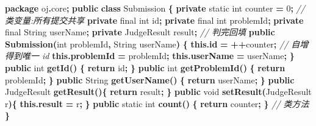 \documentclass[
  11pt,
]{ctexart}
\newenvironment{Shaded}{\begin{snugshade}}{\end{snugshade}}
\newcommand{\BuiltInTok}[1]{#1}
\newcommand{\CommentTok}[1]{\textcolor[rgb]{0.56,0.35,0.01}{\textit{#1}}}
\newcommand{\ControlFlowTok}[1]{\textcolor[rgb]{0.13,0.29,0.53}{\textbf{#1}}}
\newcommand{\DataTypeTok}[1]{\textcolor[rgb]{0.13,0.29,0.53}{#1}}
\newcommand{\DecValTok}[1]{\textcolor[rgb]{0.00,0.00,0.81}{#1}}
\newcommand{\FunctionTok}[1]{\textcolor[rgb]{0.13,0.29,0.53}{\textbf{#1}}}
\newcommand{\ImportTok}[1]{#1}
\newcommand{\KeywordTok}[1]{\textcolor[rgb]{0.13,0.29,0.53}{\textbf{#1}}}
\newcommand{\NormalTok}[1]{#1}
\newcommand{\OperatorTok}[1]{\textcolor[rgb]{0.81,0.36,0.00}{\textbf{#1}}}
\begin{document}
\begin{Shaded}
\begin{Highlighting}[]
\KeywordTok{package}\ImportTok{ oj}\OperatorTok{.}\ImportTok{core}\OperatorTok{;}
\KeywordTok{public} \KeywordTok{class}\NormalTok{ Submission }\OperatorTok{\{}
    \KeywordTok{private} \DataTypeTok{static} \DataTypeTok{int}\NormalTok{ counter }\OperatorTok{=} \DecValTok{0}\OperatorTok{;}     \CommentTok{// 类变量:所有提交共享}
    \KeywordTok{private} \DataTypeTok{final} \DataTypeTok{int}\NormalTok{ id}\OperatorTok{;}
    \KeywordTok{private} \DataTypeTok{final} \DataTypeTok{int}\NormalTok{ problemId}\OperatorTok{;}
    \KeywordTok{private} \DataTypeTok{final} \BuiltInTok{String}\NormalTok{ userName}\OperatorTok{;}
    \KeywordTok{private}\NormalTok{ JudgeResult result}\OperatorTok{;}         \CommentTok{// 判完回填}
    \KeywordTok{public} \FunctionTok{Submission}\OperatorTok{(}\DataTypeTok{int}\NormalTok{ problemId}\OperatorTok{,} \BuiltInTok{String}\NormalTok{ userName}\OperatorTok{)} \OperatorTok{\{}
        \KeywordTok{this}\OperatorTok{.}\FunctionTok{id} \OperatorTok{=} \OperatorTok{++}\NormalTok{counter}\OperatorTok{;}           \CommentTok{// 自增得到唯一 id}
        \KeywordTok{this}\OperatorTok{.}\FunctionTok{problemId} \OperatorTok{=}\NormalTok{ problemId}\OperatorTok{;}
        \KeywordTok{this}\OperatorTok{.}\FunctionTok{userName} \OperatorTok{=}\NormalTok{ userName}\OperatorTok{;}
    \OperatorTok{\}}
    \KeywordTok{public} \DataTypeTok{int} \FunctionTok{getId}\OperatorTok{()}            \OperatorTok{\{} \ControlFlowTok{return}\NormalTok{ id}\OperatorTok{;} \OperatorTok{\}}
    \KeywordTok{public} \DataTypeTok{int} \FunctionTok{getProblemId}\OperatorTok{()}     \OperatorTok{\{} \ControlFlowTok{return}\NormalTok{ problemId}\OperatorTok{;} \OperatorTok{\}}
    \KeywordTok{public} \BuiltInTok{String} \FunctionTok{getUserName}\OperatorTok{()}   \OperatorTok{\{} \ControlFlowTok{return}\NormalTok{ userName}\OperatorTok{;} \OperatorTok{\}}
    \KeywordTok{public}\NormalTok{ JudgeResult }\FunctionTok{getResult}\OperatorTok{()\{} \ControlFlowTok{return}\NormalTok{ result}\OperatorTok{;} \OperatorTok{\}}
    \KeywordTok{public} \DataTypeTok{void} \FunctionTok{setResult}\OperatorTok{(}\NormalTok{JudgeResult r}\OperatorTok{)\{} \KeywordTok{this}\OperatorTok{.}\FunctionTok{result} \OperatorTok{=}\NormalTok{ r}\OperatorTok{;} \OperatorTok{\}}
    \KeywordTok{public} \DataTypeTok{static} \DataTypeTok{int} \FunctionTok{count}\OperatorTok{()}     \OperatorTok{\{} \ControlFlowTok{return}\NormalTok{ counter}\OperatorTok{;} \OperatorTok{\}}   \CommentTok{// 类方法}
\OperatorTok{\}}
\end{Highlighting}
\end{Shaded}
\end{document}

